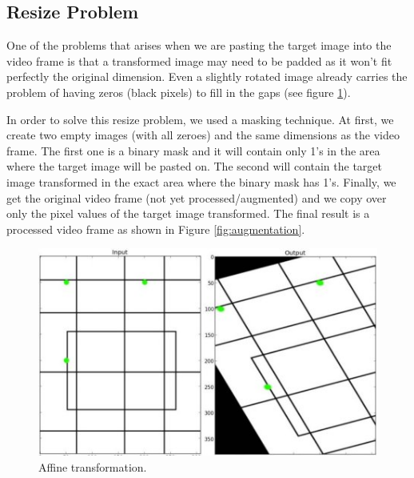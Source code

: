 \documentclass[]{IEEEtran}
\begin{document}
\subsection{Resize Problem}
One of the problems that arises when we are pasting the target image into the video frame is that a transformed image may need to be padded as it won't fit perfectly the original dimension. Even a slightly rotated image already carries the problem of having zeros (black pixels) to fill in the gaps (see figure \ref{fig:affine}).

In order to solve this resize problem, we used a masking technique. At first, we create two empty images (with all zeroes) and the same dimensions as the video frame. The first one is a binary mask and it will contain only 1's in the area where the target image will be pasted on. The second will contain the target image transformed in the exact area where the binary mask has 1's. Finally, we get the original video frame (not yet processed/augmented) and we copy over only the pixel values of the target image transformed. The final result is a processed video frame as shown in Figure \ref{fig:augmentation}.

\begin{figure}[h]
  \includegraphics[width=\linewidth]{./figures/augmentation/affine.jpg}
  \caption{Affine transformation. \cite{affine_transform_image}}
  \label{fig:affine}
\end{figure}
\end{document}
